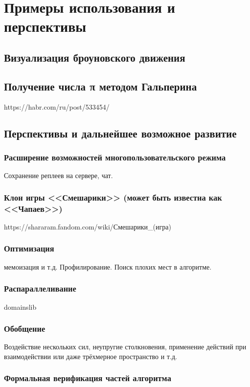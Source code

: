 \chapter{Примеры использования и перспективы}

\TODO

\section{Визуализация броуновского движения}

\TODO

\section{Получение числа π методом Гальперина}

\TODO https://habr.com/ru/post/533454/

\section{Перспективы и дальнейшее возможное развитие}

\subsection{Расширение возможностей многопользовательского режима}

\TODO Сохранение реплеев на сервере, чат.

\subsection{Клон игры <<Смешарики>> (может быть известна как <<Чапаев>>)}

\TODO https://shararam.fandom.com/wiki/Смешарики\_(игра)

\subsection{Оптимизация}

\TODO мемоизация и т.д.
Профилирование. Поиск плохих мест в алгоритме.

\subsection{Распараллеливание}

\TODO domainslib

\subsection{Обобщение \TODO}

\TODO Воздействие нескольких сил, неупругие столкновения,
применение действий при взаимодействии или даже трёхмерное пространство и т.д.

\subsection{Формальная верификация частей алгоритма}

\TODO
